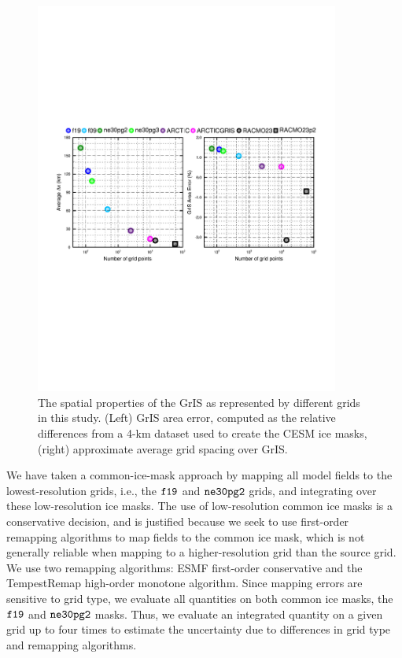 \documentclass[draft]{agujournal2019}
\begin{document}
\begin{figure}[t]
\begin{center}
         \includegraphics[width=100mm]{temp_grisres.pdf}
\end{center}
\caption{The spatial properties of the GrIS as represented by different grids in this study. (Left) GrIS area error, computed as the relative differences from a 4-km dataset used to create the CESM ice masks, (right) approximate average grid spacing over GrIS.}
\label{fig:grisdx}
\end{figure}

We have taken a common-ice-mask approach by mapping all model fields to the lowest-resolution grids, i.e., the $\tt f19$ and $\tt ne30pg2$ grids, and integrating over these low-resolution ice masks. The use of low-resolution common ice masks is a conservative decision, and is justified because we seek to use first-order remapping algorithms to map fields to the common ice mask, which is not generally reliable when mapping to a higher-resolution grid than the source grid. We use two remapping algorithms: ESMF first-order conservative and the TempestRemap \cite{TempestRemap} high-order monotone algorithm. Since mapping errors are sensitive to grid type, we evaluate all quantities on both common ice masks, the $\tt f19$ and $\tt ne30pg2$ masks. Thus, we evaluate an integrated quantity on a given grid up to four times to estimate the uncertainty due to differences in grid type and remapping algorithms.
\end{document}
